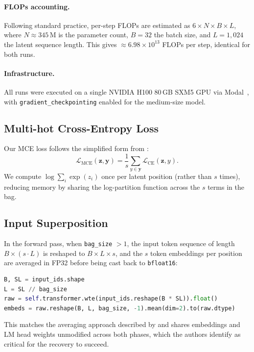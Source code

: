 \documentclass{article}
\begin{document}
\paragraph{FLOPs accounting.}
Following standard practice, per-step FLOPs are estimated as
$6 \times N \times B \times L$, where $N \approx 345$\,M is the parameter
count, $B=32$ the batch size, and $L=1{,}024$ the latent sequence length.
This gives $\approx 6.98 \times 10^{13}$ FLOPs per step, identical for
both runs.

\paragraph{Infrastructure.}
All runs were executed on a single NVIDIA H100 80\,GB SXM5 GPU via
Modal~\citep{modal2024}, with \texttt{gradient\_checkpointing} enabled for
the medium-size model.

\subsection{Multi-hot Cross-Entropy Loss}

Our MCE loss follows the simplified form from \citet{peng2026efficient}:
\begin{equation}
    \mathcal{L}_{\text{MCE}}(\mathbf{z}, \mathbf{y})
    = \frac{1}{s}\sum_{y \in \mathbf{y}} \mathcal{L}_{\text{CE}}(\mathbf{z}, y).
\end{equation}
We compute $\log\sum_i \exp(z_i)$ once per latent position (rather than $s$ times),
reducing memory by sharing the log-partition function across the $s$ terms in the bag.

\subsection{Input Superposition}

In the forward pass, when \texttt{bag\_size} $> 1$, the input token sequence
of length $B \times (s \cdot L)$ is reshaped to $B \times L \times s$, and the
$s$ token embeddings per position are averaged in FP32 before being cast back to
\texttt{bfloat16}:
\begin{lstlisting}[language=Python, caption=Input superposition in our implementation]
B, SL = input_ids.shape
L = SL // bag_size
raw = self.transformer.wte(input_ids.reshape(B * SL)).float()
embeds = raw.reshape(B, L, bag_size, -1).mean(dim=2).to(raw.dtype)
\end{lstlisting}
This matches the averaging approach described by \citet{peng2026efficient}
and shares embeddings and LM head weights unmodified across both phases,
which the authors identify as critical for the recovery to succeed.
\end{document}
